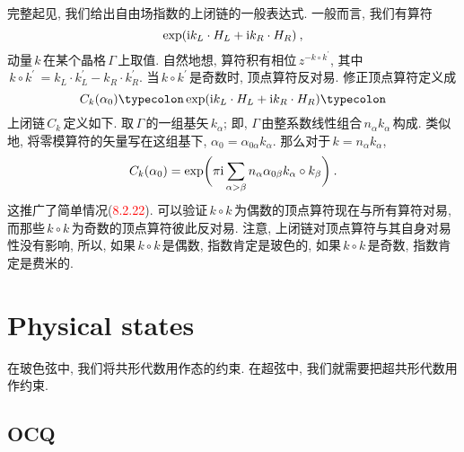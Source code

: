 完整起见, 我们给出自由场指数的上闭链的一般表达式. 一般而言, 我们有算符
\begin{equation}
    \exp(\mathrm{i} k_{L}\cdot H_{L} + \mathrm{i} k_{R}\cdot H_{R}) \:, \label{10.4.26}
\end{equation}
动量$\,k\,$在某个晶格$\,\Gamma\,$上取值. 自然地想, 算符积有相位$\,z^{-k\circ k^{\prime}}$, 其中$\,k\circ k^{\prime}\,=k_{L}\cdot k_{L}^{\prime} -k_{R}\cdot k_{R}^{\prime}$. 当$\,k\circ k^{\prime}\,$是奇数时, 顶点算符反对易. 修正顶点算符定义成
\begin{equation}
    C_{k}(\alpha_{0}) \typecolon\exp(\mi k_{L}\cdot H_{L} + \mi k_{R}\cdot H_{R})\typecolon \label{10.4.27}
\end{equation}
上闭链$\, C_{k}\,$定义如下. 取$\,\Gamma\,$的一组基矢$\,k_{\alpha}$; 即, $\Gamma\,$由整系数线性组合$\,n_{\alpha}k_{\alpha}\,$构成. 类似地, 将零模算符的矢量写在这组基下, $\alpha_{0}=\alpha_{0\alpha}k_{\alpha}$. 那么对于$\,k=n_{\alpha} k_{\alpha}$,
\begin{equation}
    C_{k}(\alpha_{0})=\exp \biggl( \pi\mathrm{i} \sum_{\alpha >\beta} 
    n_{\alpha}\alpha_{0\beta}k_{\alpha}\circ k_{\beta}\biggr) \:. \label{10.4.28} 
\end{equation}
这推广了简单情况(\textcolor{red}{8.2.22}). 可以验证$\,k\circ k\,$为偶数的顶点算符现在与所有算符对易, 而那些$\,k\circ k\,$为奇数的顶点算符彼此反对易. 注意, 上闭链对顶点算符与其自身对易性没有影响, 所以, 如果$\,k\circ k\,$是偶数, 指数肯定是玻色的, 如果$\,k\circ k\,$是奇数, 指数肯定是费米的.

\section{Physical states}

在玻色弦中, 我们将共形代数用作态的约束. 在超弦中, 我们就需要把超共形代数用作约束.

\subsection*{OCQ}

